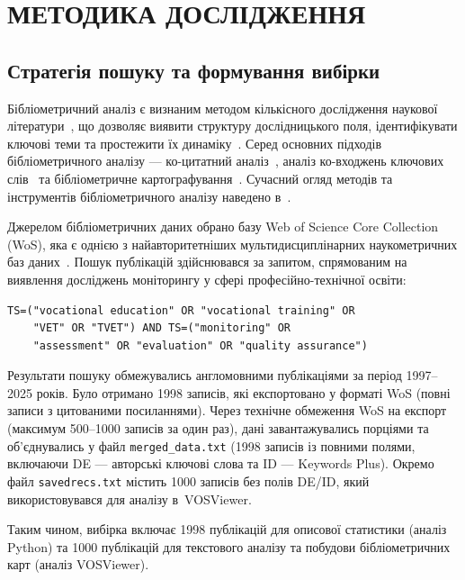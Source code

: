 \section{\MakeUppercase{Методика дослідження}}
\label{sec:chapter1}

\subsection{Стратегія пошуку та формування вибірки}
\label{sec:search_strategy}

Бібліометричний аналіз є визнаним методом кількісного дослідження наукової літератури~\cite{Pritchard1969, Donthu2021}, що дозволяє виявити структуру дослідницького поля, ідентифікувати ключові теми та простежити їх динаміку~\cite{Zupic2015}. Серед основних підходів бібліометричного аналізу --- ко-цитатний аналіз~\cite{Small1973}, аналіз ко-входжень ключових слів~\cite{Callon1983} та бібліометричне картографування~\cite{Cobo2011}. Сучасний огляд методів та інструментів бібліометричного аналізу наведено в~\cite{Aria2017}.

Джерелом бібліометричних даних обрано базу Web of Science Core Collection (WoS), яка є однією з найавторитетніших мультидисциплінарних наукометричних баз даних~\cite{Birkle2020}. Пошук публікацій здійснювався за запитом, спрямованим на виявлення досліджень моніторингу у сфері професійно-технічної освіти:

\begin{verbatim}
TS=("vocational education" OR "vocational training" OR
    "VET" OR "TVET") AND TS=("monitoring" OR
    "assessment" OR "evaluation" OR "quality assurance")
\end{verbatim}

Результати пошуку обмежувались англомовними публікаціями за період 1997--2025 років. Було отримано 1998 записів, які експортовано у форматі WoS (повні записи з цитованими посиланнями). Через технічне обмеження WoS на експорт (максимум 500--1000 записів за один раз), дані завантажувались порціями та об'єднувались у файл \texttt{merged\_data.txt} (1998 записів із повними полями, включаючи DE --- авторські ключові слова та ID --- Keywords Plus). Окремо файл \texttt{savedrecs.txt} містить 1000 записів без полів DE/ID, який використовувався для аналізу в~VOSViewer.

Таким чином, вибірка включає 1998 публікацій для описової статистики (аналіз Python) та 1000 публікацій для текстового аналізу та побудови бібліометричних карт (аналіз VOSViewer).

